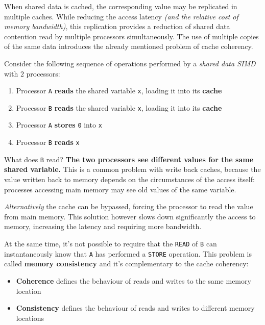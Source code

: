 \documentclass[english]{article}
\begin{document}
When shared data is cached, the corresponding value may be replicated in multiple caches.
While reducing the access latency \textit{(and the relative cost of memory bandwidth)}, this replication provides a reduction of shared data contention read by multiple processors simultaneously.
The use of multiple copies of the same data introduces the already mentioned problem of cache coherency.

Consider the following sequence of operations performed by a \textit{shared data SIMD} with \(2\) processors:

\begin{enumerate}
  \item Processor \texttt{A} \textbf{reads} the shared variable \texttt{x}, loading it into its \textbf{cache}
  \item Processor \texttt{B} \textbf{reads} the shared variable \texttt{x}, loading it into its \textbf{cache}
  \item Processor \texttt{A} \textbf{stores} \texttt{0} into \texttt{x}
  \item Processor \texttt{B} \textbf{reads} \texttt{x}
\end{enumerate}

What does \texttt{B} read?
\textbf{The two processors see different values for the same shared variable.}
This is a common problem with write back caches, because the value written back to memory depends on the circumstances of the access itself: processes accessing main memory may see old values of the same variable.

\textit{Alternatively} the cache can be bypassed, forcing the processor to read the value from main memory.
This solution however slows down significantly the access to memory, increasing the latency and requiring more bandwidth.

At the same time, it's not possible to require that the \texttt{READ} of \texttt{B} can instantaneously know that \texttt{A} has performed a \texttt{STORE} operation.
This problem is called \textbf{memory consistency} and it's complementary to the cache coherency:

\begin{itemize}
  \item \textbf{Coherence} defines the behaviour of reads and writes to the same memory location
  \item \textbf{Consistency} defines the behaviour of reads and writes to different memory locations
\end{itemize}
\end{document}
